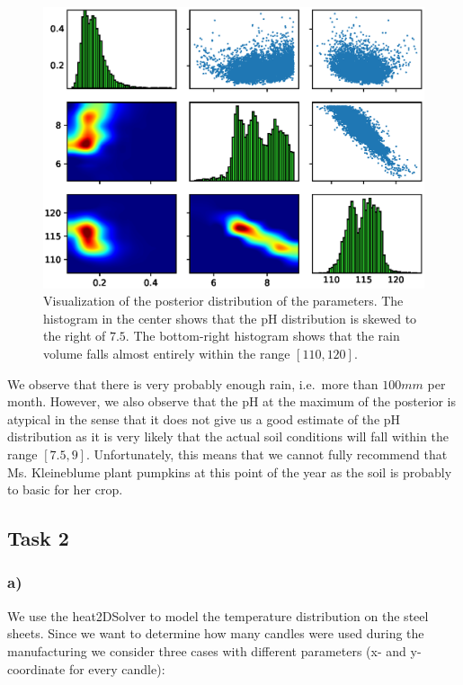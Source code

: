 \documentclass{article}
\begin{document}
    \begin{figure}[H]
        \begin{center}
            \includegraphics[width=.75\textwidth]{task1/results/task1d.eps}
        \end{center}
        \caption{Visualization of the posterior distribution of the
        parameters.
        The histogram in the center shows that the pH distribution is skewed
        to the right of $7.5$.
        The bottom-right histogram shows that the rain volume falls almost
        entirely within the range $\left[ 110, 120 \right]$.
        }
        \label{fig:GrassPosterior}
    \end{figure}

    We observe that there is very probably enough rain, i.e.\ more than
    $100mm$ per month.
    However, we also observe that the pH at the maximum of the posterior is
    atypical in the sense that it does not give us a good estimate of the pH
    distribution as it is very likely that the actual soil conditions will
    fall within the range $\left[ 7.5, 9 \right]$.
    Unfortunately, this means that we cannot fully recommend that Ms.
    Kleineblume plant pumpkins at this point of the year as the soil is
    probably to basic for her crop.

    \subsection*{Task 2}
    \label{subsec:Task2}

    \subsubsection*{a)}
    \label{subsubsec:Task2a}

    We use the heat2DSolver to model the temperature distribution on the
    steel sheets.
    Since we want to determine how many candles were used during the
    manufacturing we consider three cases with different parameters (x- and
    y-coordinate for every candle):
\end{document}
